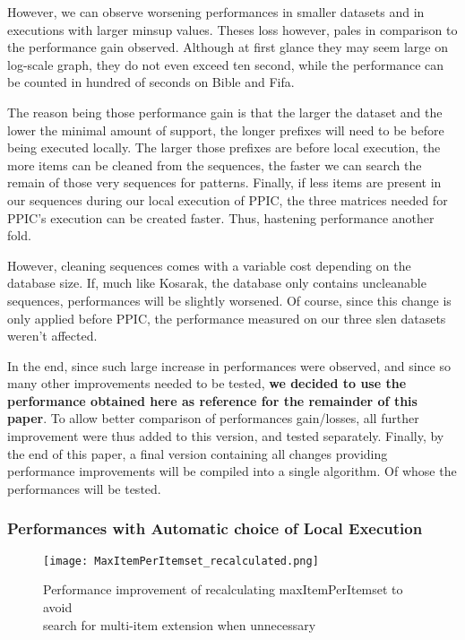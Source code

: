 \documentclass{eplmastersthesis}
\begin{document}
However, we can observe worsening performances in smaller datasets and in executions with larger minsup values. Theses loss however, pales in comparison to the performance gain observed. Although at first glance they may seem large on log-scale graph, they do not even exceed ten second, while the performance can be counted in hundred of seconds on Bible and Fifa. \newline

The reason being those performance gain is that the larger the dataset and the lower the minimal amount of support, the longer prefixes will need to be before being executed locally. The larger those prefixes are before local execution, the more items can be cleaned from the sequences, the faster we can search the remain of those very sequences for patterns. Finally, if less items are present in our sequences during our local execution of PPIC, the three matrices needed for PPIC's execution can be created faster. Thus, hastening performance another fold. \newline

However, cleaning sequences comes with a variable cost depending on the database size. If, much like Kosarak, the database only contains uncleanable sequences, performances will be slightly worsened. Of course, since this change is only applied before PPIC, the performance measured on our three slen datasets weren't affected. \newline

In the end, since such large increase in performances were observed, and since so many other improvements needed to be tested, \textbf{we decided to use the performance obtained here as reference for the remainder of this paper}. To allow better comparison of performances gain/losses, all further improvement were thus added to this version, and tested separately. Finally, by the end of this paper, a final version containing all changes providing performance improvements will be compiled into a single algorithm. Of whose the performances will be tested.

\subsubsection{Performances with Automatic choice of Local Execution}

\begin{figure}[h]
  \centering
  \texttt{[image: MaxItemPerItemset\_recalculated.png]}
  \caption[Automatic detection of item-sets type in dataset]{
		Performance improvement of recalculating maxItemPerItemset to avoid \\
		search for multi-item extension when unnecessary
	\endtabular}
  \label{fig:maxItemPerItemset_recalculated}
\end{figure}
\end{document}
